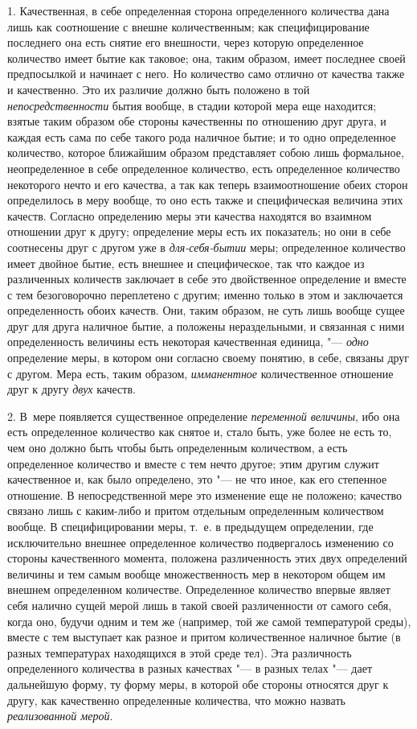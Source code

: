 1. Качественная, в себе определенная сторона
определенного количества дана лишь как соотношение с внешне количественным;
как специфицирование последнего она есть снятие его внешности, через
которую определенное количество имеет бытие как таковое; она, таким
образом, имеет последнее своей предпосылкой и начинает с него. Но
количество само отлично от качества также и качественно. Это их различие
должно быть положено в той {\em непосредственности}
бытия вообще, в стадии которой мера еще находится; взятые таким образом обе
стороны качественны по отношению друг друга, и каждая есть сама по себе
такого рода наличное бытие; и то одно определенное количество, которое
ближайшим образом представляет собою лишь формальное, неопределенное в себе
определенное количество, есть определенное количество некоторого нечто и
его качества, а так как теперь взаимоотношение обеих сторон определилось в
меру вообще, то оно есть также и специфическая величина этих качеств.
Согласно определению меры эти качества находятся во взаимном отношении друг
к другу; определение меры есть их показатель; но они в себе соотнесены друг
с другом уже в {\em для-себя-бытии} меры; определенное
количество имеет двойное бытие, есть внешнее и специфическое, так что
каждое из различенных количеств заключает в себе это двойственное
определение и вместе с тем безоговорочно переплетено с другим; именно
только в этом и заключается определенность обоих качеств. Они, таким
образом, не суть лишь вообще сущее друг для друга наличное бытие, а
положены нераздельными, и связанная с ними определенность величины есть
некоторая качественная единица, "--- {\em одно}
определение меры, в котором они согласно своему понятию, в себе, связаны
друг с другом. Мера есть, таким образом,
{\em имманентное} количественное отношение друг к другу
{\em двух} качеств.

2. В~мере появляется существенное определение
{\em переменной величины}, ибо она есть определенное
количество как снятое и, стало быть, уже более не есть то, чем оно должно
быть чтобы быть определенным количеством, а есть определенное количество и
вместе с тем нечто другое; этим другим служит качественное и, как было
определено, это "--- не что иное, как его степенное отношение. В
непосредственной мере это изменение еще не положено; качество связано лишь
с каким-либо и притом отдельным определенным количеством вообще. В
специфицировании меры, т.~е. в предыдущем определении, где исключительно
внешнее определенное количество подвергалось изменению со стороны
качественного момента, положена различенность этих двух определений
величины и тем самым вообще множественность мер в некотором общем им
внешнем определенном количестве. Определенное количество впервые являет
себя налично сущей мерой лишь в такой своей различенности от самого себя,
когда оно, будучи одним и тем же (например, той же самой температурой
среды), вместе с тем выступает как разное и притом количественное наличное
бытие (в разных температурах находящихся в этой среде тел). Эта различность
определенного количества в разных качествах "--- в разных телах "--- дает
дальнейшую форму, ту форму меры, в которой обе стороны относятся друг к
другу, как качественно определенные количества, что можно назвать
{\em реализованной мерой}.

